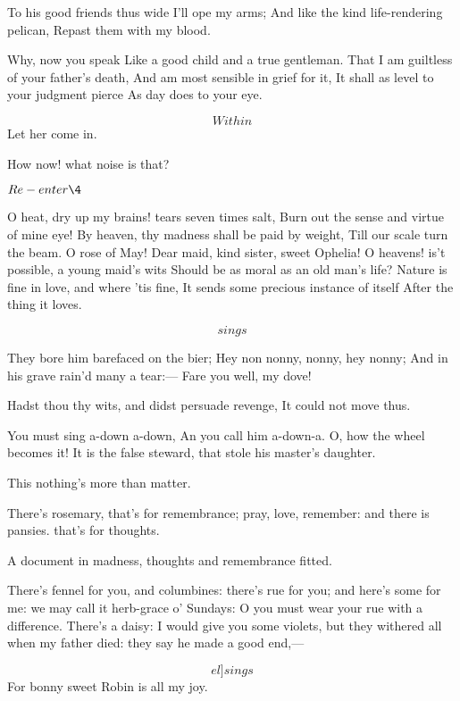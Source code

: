 \documentclass[11pt]{book}
\newenvironment {song}[1][0]
 {\Versus 
  \Locus \textus {+7em+#1em} 
  \Forma \strophae {01}
 }
 {\endVersus}
\begin{document}
\7	To his good friends thus wide I'll ope my arms;
	And like the kind life-rendering pelican,
	Repast them with my blood.

\2	Why, now you speak
	Like a good child and a true gentleman.
	That I am guiltless of your father's death,
	And am most sensible in grief for it,
	It shall as level to your judgment pierce
	As day does to your eye.

	\[Within\]                Let her come in.

\7	How now! what noise is that?

	\(Re-enter \4\)

	O heat, dry up my brains! tears seven times salt,
	Burn out the sense and virtue of mine eye!
	By heaven, thy madness shall be paid by weight,
	Till our scale turn the beam. O rose of May!
	Dear maid, kind sister, sweet Ophelia!
	O heavens! is't possible, a young maid's wits
	Should be as moral as an old man's life?
	Nature is fine in love, and where 'tis fine,
	It sends some precious instance of itself
	After the thing it loves.

\4	\[sings\]
\begin{song}[-3]
	They bore him barefaced on the bier;
	Hey non nonny, nonny, hey nonny;
	And in his grave rain'd many a tear:---
	Fare you well, my dove!
\end{song}

\7	Hadst thou thy wits, and didst persuade revenge,
	It could not move thus.

\Prosa
\4	You must sing a-down a-down,
	An you call him a-down-a.
	O, how the wheel becomes it! It is the false
	steward, that stole his master's daughter.

\7	This nothing's more than matter.

\4	\DriveOut* There's rosemary, that's for remembrance; pray,
	love, remember: and there is pansies. that's for thoughts.

\7	A document in madness, thoughts and remembrance fitted.

\4	There's fennel for you, and columbines: there's rue
	for you; and here's some for me: we may call it
	herb-grace o' Sundays: O you must wear your rue with
	a difference. There's a daisy: I would give you
	some violets, but they withered all when my father
	died: they say he made a good end,---

\begin{song}[-3]
	\[el]sings\] For bonny sweet Robin is all my joy.
\end{song}
\end{document}

